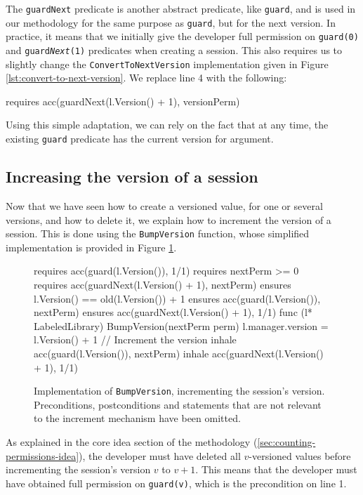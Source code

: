 The \texttt{guardNext} predicate is another abstract predicate, like \texttt{guard}, and is used in our methodology for the same purpose as \texttt{guard}, but for the next version. 
In practice, it means that we initially give the developer full permission on \texttt{guard(0)} and \texttt{guard\emph{Next}(1)} predicates when creating a session.
This also requires us to slightly change the \texttt{ConvertToNextVersion} implementation given in Figure \ref{lst:convert-to-next-version}.
We replace line 4 with the following:
\begin{gobra}
requires acc(guardNext(l.Version() + 1), versionPerm)
\end{gobra}

Using this simple adaptation, we can rely on the fact that at any time, the existing \texttt{guard} predicate has the current version for argument.

\subsection{Increasing the version of a session}

Now that we have seen how to create a versioned value, for one or several versions, and how to delete it, we explain how to increment the version of a session. This is done using the \texttt{BumpVersion} function, whose simplified implementation is provided in Figure \ref{lst:bump-version}.

\begin{figure}
    \begin{gobra}
requires acc(guard(l.Version()), 1/1)
requires nextPerm >= 0
requires acc(guardNext(l.Version() + 1), nextPerm)
ensures  l.Version() == old(l.Version()) + 1
ensures  acc(guard(l.Version()), nextPerm)
ensures  acc(guardNext(l.Version() + 1), 1/1)
func (l* LabeledLibrary) BumpVersion(nextPerm perm) {
    l.manager.version = l.Version() + 1 // Increment the version
    inhale acc(guard(l.Version()), nextPerm)
    inhale acc(guardNext(l.Version() + 1), 1/1)
}
    \end{gobra}
    \caption{Implementation of \texttt{BumpVersion}, incrementing the session's version. Preconditions, postconditions and statements that are not relevant to the increment mechanism have been omitted.}
    \label{lst:bump-version}
\end{figure}

As explained in the core idea section of the methodology (\ref{sec:counting-permissions-idea}), the developer must have deleted all $v$-versioned values before incrementing the session's version $v$ to $v+1$. This means that the developer must have obtained full permission on \texttt{guard(v)}, which is the precondition on line 1.

